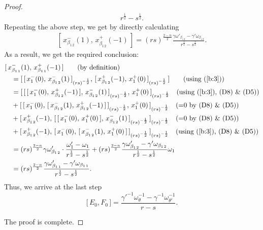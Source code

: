 \documentclass{amsproc}
\theoremstyle{remark}
\numberwithin{equation}{section}
\begin{document}
\begin{proof}
\begin{equation*}
\begin{split}
{r^{\frac{1}{2}}-s^{\frac{1}{2}}}.
\end{split}
\end{equation*}
Repeating the above step, we get by directly calculating
\begin{equation}
\begin{split}
[\,x_{\beta_{1\,2}}^-(1),\,x_{\beta_{1\,2}}^+(-1)\,]
=(rs)^{\frac{2-n}{2}}\frac{\gamma{\omega}'_{\beta_{1\,2}}-\gamma'{\omega}_{\beta_{1\,2}}}
{r^{\frac{1}{2}}-s^{\frac{1}{2}}}.
\end{split}
\end{equation}
As a result, we get the required conclusion:
\begin{equation*}
\begin{split}
&[\,x_{\beta_{1\,1}}^-(1),\,x_{\beta_{1\,1}}^+(-1)\,]\qquad{\hbox{(by definition)}}\\
&\quad=[\,[\,x_{1}^-(0),\,x_{\beta_{1\,2}}^-(1)\,]_{(rs)^{-\frac{1}{2}}}
,\,[\,x_{\beta_{1\,2}}^+(-1),\,x_{1}^+(0)\,]_{(rs)^{-\frac{1}{2}}}\,]
\qquad{\hbox{(using (\ref{b:3}))}}\\
&\quad=[\,[\,[\,x_{1}^-(0),\,x_{\beta_{1\,2}}^+(-1)\,],\,x_{\beta_{1\,2}}^-(1)
\,]_{(rs)^{-\frac{1}{2}}}
,\,x_{1}^+(0)\,]_{(rs)^{-\frac{1}{2}}}\quad{\hbox{(using (\ref{b:3}), (D8) \& (D5))}}\\
&\quad+[\,[\,x_{1}^-(0),\,[\,x_{\beta_{1\,2}}^-(1),\,x_{\beta_{1\,2}}^+(-1)\,]
\,]_{(rs)^{-\frac{1}{2}}}
,\,x_{1}^+(0)\,]_{(rs)^{-\frac{1}{2}}}\quad{\hbox{(=0 by (D8) \& (D5))}}\\
&\quad+[\,x_{\beta_{1\,2}}^+(-1),\,[\,
[\,x_{1}^-(0),\,x_{1}^+(0)\,],\,x_{\beta_{1\,2}}^-(1)\,]_{(rs)^{-\frac{1}{2}}}
\,]_{(rs)^{-\frac{1}{2}}}\quad{\hbox{(=0 by (D8) \& (D5))}}\\
&\quad+[\,x_{\beta_{1\,2}}^+(-1),\,[\,x_{1}^-(0),\,
[\,x_{\beta_{1\,2}}^-(1),\,x_{1}^+(0)\,]\,]_{(rs)^{-\frac{1}{2}}}
\,]_{(rs)^{-\frac{1}{2}}}\quad{\hbox{(using (\ref{b:3}), (D8) \& (D5))}}\\
&\quad=(rs)^{\frac{2-n}{2}}\gamma{\omega}'_{\beta_{1\,2}}\cdot \frac{{\omega}'_{1}-{\omega}_{1}}
{r^{\frac{1}{2}}-s^{\frac{1}{2}}}
+(rs)^{\frac{2-n}{2}}\frac{\gamma{\omega}'_{\beta_{1\,2}}-\gamma'{\omega}_{\beta_{1\,2}}}
{r^{\frac{1}{2}}-s^{\frac{1}{2}}}{\omega}_{1}\\
&\quad=(rs)^{\frac{2-n}{2}}\frac{\gamma{\omega}'_{\beta_{1\,1}}-\gamma'{\omega}_{\beta_{1\,1}}}
{r^{\frac{1}{2}}-s^{\frac{1}{2}}}.
\end{split}
\end{equation*}
Thus, we arrive at the last step
$$\bigl[\,E_0,
F_0\,\bigr]=\frac{\gamma'^{-1}{\omega}_{\theta}^{-1}-\gamma^{-1}{\omega}_{\theta'}^{-1}}{r-s}.$$

The proof is complete.
\end{proof}
\end{document}
